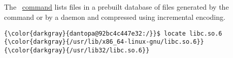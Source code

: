 % 

\subsection{\locate}
\label{sec:locate}
The  \ \href{https://en.wikipedia.org/wiki/Locate_(Unix)}{command} lists files in a prebuilt database of files generated by the  command or by a daemon and compressed using incremental encoding.
{\footnotesize{
\begin{Verbatim}[commandchars=\\\{\}]
{\color{darkgray}{dantopa@92bc4c447e32:/}}$ locate libc.so.6
{\color{darkgray}{/usr/lib/x86_64-linux-gnu/libc.so.6}}
{\color{darkgray}{/usr/lib32/libc.so.6}}
\end{Verbatim}
}}

\endinput  %
